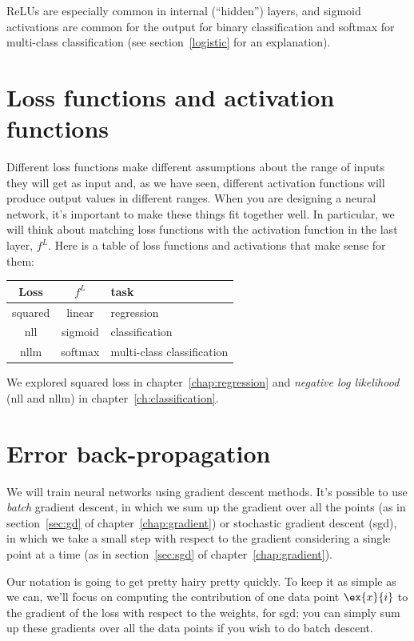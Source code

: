 ReLUs are especially common in internal (``hidden'') layers, and
sigmoid activations are common for the output for binary
classification and softmax for multi-class classification
(see section~\ref{logistic} for an explanation). 

\section{Loss functions and activation functions}
Different loss functions make different assumptions about the range of
inputs they will get as input and, as we have seen, different
activation functions will produce output values in different ranges.
When you are designing a neural network, it's important to make these
things fit together well.  In particular, we will think about matching
loss functions with the activation function in the last layer, $f^L$.  
Here is a table of loss functions and activations that make sense for them:
\begin{center}
\begin{tabular}{c c l}
  Loss & $f^L$ & task\\
  \hline
  squared & linear & regression \\
  {\sc nll} & sigmoid & classification\\
  {\sc nllm} & softmax & multi-class classification
\end{tabular}
\end{center}
We explored squared loss in chapter~\ref{chap:regression} and
{\em negative log likelihood} ({\sc nll} and {\sc nllm}) in
chapter~\ref{ch:classification}. 



\section{Error back-propagation}
We will train neural networks using gradient descent methods.  It's
possible to use {\em batch} gradient descent, in which we sum up the
gradient over all the points (as in section~\ref{sec:gd} of
chapter~\ref{chap:gradient}) or
stochastic gradient descent ({\sc sgd}), in which we take a small step with
respect to the gradient considering a single point at a time (as in
section~\ref{sec:sgd} of chapter~\ref{chap:gradient}).

Our notation is going to get pretty hairy pretty quickly.  To keep it
as simple as we can, we'll focus on computing the contribution of one
data point $\ex{x}{i}$ to the gradient of the loss with respect to the
weights, for {\sc sgd}; you can simply sum up these gradients over all
the data points if you wish to do batch descent.

